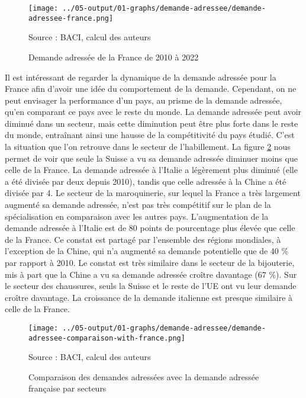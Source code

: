 \documentclass[french,10pt,a4paper]{article}
\begin{document}
\begin{figure}[!h]
  \centering  \texttt{[image: ../05-output/01-graphs/demande-adressee/demande-adressee-france.png]}
  \captionsetup{justification=raggedright,singlelinecheck=false, font=small}
  \caption*{Source : BACI, calcul des auteurs}
  \captionsetup{justification=centering, singlelinecheck=true, font=normalsize}
  \caption{Demande adressée de la France de 2010 à 2022}
  \label{fig:demande-adressee-france}
\end{figure}

Il est intéressant de regarder la dynamique de la demande adressée pour la France afin d'avoir une idée du comportement de la demande. Cependant, on ne peut envisager la performance d'un pays, au prisme de la demande adressée, qu'en comparant ce pays avec le reste du monde. La demande adressée peut avoir diminué dans un secteur, mais cette diminution peut être plus forte dans le reste du monde, entraînant ainsi une hausse de la compétitivité du pays étudié. C'est la situation que l'on retrouve dans le secteur de l'habillement. La figure \ref{fig:demande-adressee} nous permet de voir que seule la Suisse a vu sa demande adressée diminuer moins que celle de la France. La demande adressée à l'Italie a légèrement plus diminué (elle a été divisée par deux depuis 2010), tandis que celle adressée à la Chine a été divisée par 4. Le secteur de la maroquinerie, sur lequel la France a très largement augmenté sa demande adressée, n'est pas très compétitif sur le plan de la spécialisation en comparaison avec les autres pays. L'augmentation de la demande adressée à l'Italie est de 80 points de pourcentage plus élevée que celle de la France. Ce constat est partagé par l'ensemble des régions mondiales, à l'exception de la Chine, qui n'a augmenté sa demande potentielle que de 40 \% par rapport à 2010. Le constat est très similaire dans le secteur de la bijouterie, mis à part que la Chine a vu sa demande adressée croître davantage (67 \%). Sur le secteur des chaussures, seuls la Suisse et le reste de l'UE ont vu leur demande croître davantage. La croissance de la demande italienne est presque similaire à celle de la France.

\begin{figure}[!h]
  \centering
  \texttt{[image: ../05-output/01-graphs/demande-adressee/demande-adressee-comparaison-with-france.png]}
  \captionsetup{justification=raggedright,singlelinecheck=false, font=small}
  \caption*{Source : BACI, calcul des auteurs}
  \captionsetup{justification=centering, singlelinecheck=true, font=normalsize}
  \caption{Comparaison des demandes adressées avec la demande adressée française par secteurs}
  \label{fig:demande-adressee}
\end{figure}
\end{document}
